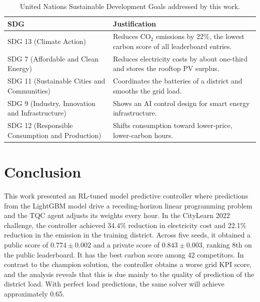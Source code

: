 \documentclass[conference]{IEEEtran}
\begin{document}
\begin{table}[!t]
\centering
\caption{United Nations Sustainable Development Goals addressed by this work.}
\label{tab:sdg}
\footnotesize
\renewcommand{\arraystretch}{1.05}
\begin{tabular}{@{}>{\raggedright\arraybackslash}p{3.15cm}>{\raggedright\arraybackslash}p{5.3cm}@{}}
\toprule
SDG & Justification \\
\midrule
SDG 13 (Climate Action) &
Reduces CO$_2$ emissions by 22\%, the lowest carbon score of all leaderboard entries. \\
SDG 7 (Affordable and Clean Energy) &
Reduces electricity costs by about one-third and stores the rooftop PV surplus. \\
SDG 11 (Sustainable Cities and Communities) &
Coordinates the batteries of a district and smooths the grid load. \\
SDG 9 (Industry, Innovation and Infrastructure) &
Shows an AI control design for smart energy infrastructure. \\
SDG 12 (Responsible Consumption and Production) &
Shifts consumption toward lower-price, lower-carbon hours. \\
\bottomrule
\end{tabular}
\end{table}

\section{Conclusion}\label{sec:conclusion}
This work presented an RL-tuned model predictive controller where predictions from the LightGBM model drive a
receding-horizon linear programming problem and the TQC agent adjusts its weights every hour. In the CityLearn 2022
challenge, the controller achieved 34.4\% reduction in electricity cost and 22.1\% reduction in the emission in the training
district. Across five seeds, it obtained a public score of $0.774 \pm 0.002$ and a private score of $0.843 \pm 0.003$,
ranking 8th on the public leaderboard. It has the best carbon score among 42 competitors. In contrast to the champion
solution, the controller obtains a worse grid KPI score, and the analysis reveals that this is due mainly to the quality of
prediction of the district load. With perfect load predictions, the same solver will achieve approximately 0.65.



\end{document}
